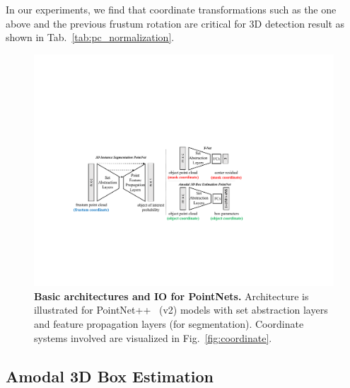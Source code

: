In our experiments, we find that coordinate transformations such as the one above and the previous frustum rotation are critical for 3D detection result as shown in Tab.~\ref{tab:pc_normalization}.  %




\begin{figure}[t!]
    \centering
    \includegraphics[width=\linewidth]{fig/network.pdf}
    \caption{\textbf{Basic architectures and IO for PointNets.} Architecture is illustrated for PointNet++~\cite{qi2017pointnetplusplus} (v2) models with set abstraction layers and feature propagation layers (for segmentation). Coordinate systems involved are visualized in Fig.~\ref{fig:coordinate}.}
    \label{fig:network}
\end{figure}

\subsection{Amodal 3D Box Estimation}
\label{sec:box_estimation}

